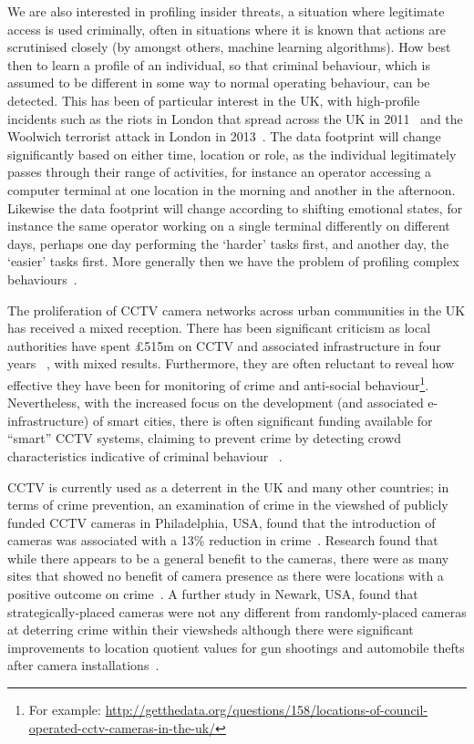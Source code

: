 \documentclass[conference]{IEEEtran}
\begin{document}
We are also interested in profiling insider threats, a situation where
legitimate access is used criminally, often in situations where it is
known that actions are scrutinised closely (by amongst others, machine
learning algorithms). How best then to learn a profile of an
individual, so that criminal behaviour, which is assumed to be
different in some way to normal operating behaviour, can be
detected. This has been of particular interest in the UK, with
high-profile incidents such as the riots in London that spread across
the UK in 2011~\cite{procter-et-al:2013} and the Woolwich terrorist
attack in London in 2013~\cite{burnap-et-al:2014}. The data footprint
will change significantly based on either time, location or role, as
the individual legitimately passes through their range of activities,
for instance an operator accessing a computer terminal at one location
in the morning and another in the afternoon. Likewise the data
footprint will change according to shifting emotional states, for
instance the same operator working on a single terminal differently on
different days, perhaps one day performing the `harder' tasks first,
and another day, the `easier' tasks first. More generally then we have
the problem of profiling complex behaviours~\cite{oatley+crick:2014}.

The proliferation of CCTV camera networks across urban communities in
the UK has received a mixed reception. There has been significant
criticism as local authorities have spent \pounds515m on CCTV and
associated infrastructure in four years ~\cite{bbw:2012}, with mixed
results. Furthermore, they are often reluctant to reveal how effective
they have been for monitoring of crime and anti-social
behaviour\footnote{For example:
\url{http://getthedata.org/questions/158/locations-of-council-operated-cctv-cameras-in-the-uk/}}.
Nevertheless, with the increased focus on the development (and
associated e-infrastructure) of smart cities, there is often
significant funding available for ``smart'' CCTV systems, claiming to
prevent crime by detecting crowd characteristics indicative of
criminal behaviour ~\cite{welsh+farrington:2009,dibella-et-al:2014}.

CCTV is currently used as a deterrent in the UK and many other
countries; in terms of crime prevention, an examination of crime in
the viewshed of publicly funded CCTV cameras in Philadelphia, USA,
found that the introduction of cameras was associated with a 13\%
reduction in crime~\cite{ratcliffe+taniguchi:2008}. Research found
that while there appears to be a general benefit to the cameras, there
were as many sites that showed no benefit of camera presence as there
were locations with a positive outcome on
crime~\cite{ratcliffe-et-al:2009}.  A further study in Newark, USA,
found that strategically-placed cameras were not any different from
randomly-placed cameras at deterring crime within their viewsheds
although there were significant improvements to location quotient
values for gun shootings and automobile thefts after camera
installations~\cite{caplan-et-al:2011}.
\end{document}
